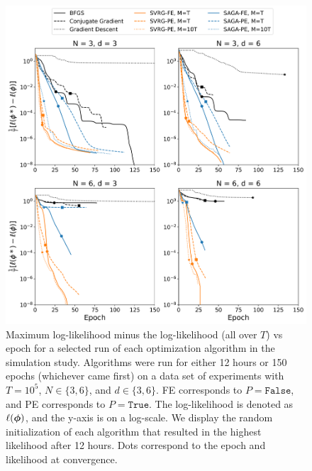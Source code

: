 \begin{figure}%
    \centering
    \includegraphics[width=5.5in]{../plt/log-like_v_epoch_T-100000-000.png}
    \caption{
    Maximum log-likelihood minus the log-likelihood (all over $T$) vs epoch for a selected run of each optimization algorithm in the simulation study. Algorithms were run for either 12 hours or 150 epochs (whichever came first) on a data set of experiments with $T=10^{5}$, $N \in \{3,6\}$, and $d \in \{3,6\}$. FE corresponds to $P = \texttt{False}$, and PE corresponds to $P = \texttt{True}$.
    The log-likelihood is denoted as $\ell(\boldsymbol{\phi})$, and the y-axis is on a log-scale. We display the random initialization of each algorithm that resulted in the highest likelihood after 12 hours. Dots correspond to the epoch and likelihood at convergence. 
    }
    \label{fig:ll_trace_sim}
\end{figure}
%
